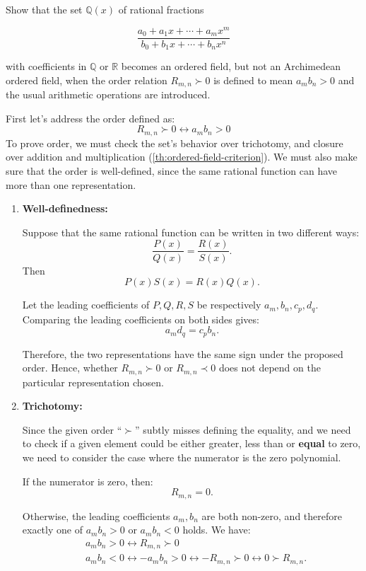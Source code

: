 \begin{problem}
Show that the set $\mathbb{Q}(x)$ of rational fractions

$$\frac{a_0+a_1x+\cdots+a_mx^m}{b_0+b_1x+\cdots+b_nx^n}$$

with coefficients in $\mathbb{Q}$ or $\mathbb{R}$ becomes an ordered field, but not an Archimedean ordered field, when the order relation $R_{m,n} \succ 0$ is defined to mean $a_m b_n>0$ and the usual arithmetic operations are introduced.
\end{problem}

\begin{solution}
First let's address the order defined as:
$$R_{m,n} \succ 0 \leftrightarrow a_mb_n > 0$$
To prove order, we must check the set's behavior over trichotomy, and closure over addition and multiplication (\cref{th:ordered-field-criterion}). We must also make sure that the order is well-defined, since the same rational function can have more than one representation.

\begin{enumerate}[label=\roman*)]
\item \textbf{Well-definedness:}

Suppose that the same rational function can be written in two different ways:
$$\frac{P(x)}{Q(x)}=\frac{R(x)}{S(x)}.$$
Then
$$P(x)S(x)=R(x)Q(x).$$

Let the leading coefficients of $P,Q,R,S$ be respectively $a_m,b_n,c_p,d_q$. Comparing the leading coefficients on both sides gives:
$$a_md_q=c_pb_n.$$

Therefore, the two representations have the same sign under the proposed order. Hence, whether $R_{m,n}\succ0$ or $R_{m,n}\prec0$ does not depend on the particular representation chosen.

\item \textbf{Trichotomy:}

Since the given order ``$\succ$'' subtly misses defining the equality, and we need to check if a given element could be either greater, less than or \textbf{equal} to zero, we need to consider the case where the numerator is the zero polynomial.

If the numerator is zero, then:
$$R_{m,n}=0.$$

Otherwise, the leading coefficients $a_m,b_n$ are both non-zero, and therefore exactly one of $a_mb_n>0$ or $a_mb_n<0$ holds. We have:
\begin{align*}
&a_mb_n > 0 \leftrightarrow R_{m,n} \succ 0 \\
&a_mb_n < 0 \leftrightarrow -a_mb_n > 0 \leftrightarrow -R_{m,n} \succ 0 \leftrightarrow 0 \succ R_{m,n}.
\end{align*}


\end{enumerate}
\end{solution}
